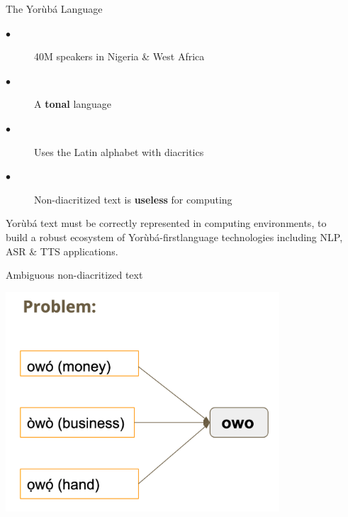 \documentclass[final]{beamer}
\newlength{\sepwid}
\newlength{\onecolwid}
\begin{document}
\begin{frame}[t] %

\begin{columns}[t] %

\begin{column}{\sepwid}\end{column} %

\begin{column}{\onecolwid} %


\begin{block}{The Yor{\`u}b{\'a} Language}

\begin{description}
  \item[$\bullet$] 40M speakers in Nigeria \& West Africa
  \item[$\bullet$] A \textbf{tonal} language
  \item[$\bullet$] Uses the Latin alphabet with diacritics
  \item[$\bullet$] Non-diacritized text is \textbf{useless} for computing
\end{description}

\vspace{10mm}

Yor{\`u}b{\'a} text must be correctly represented in computing environments, to build a robust ecosystem of Yor{\`u}b{\'a}-firstlanguage technologies including NLP, ASR \& TTS applications.

\end{block}

\vspace{10mm}

\begin{block}{Ambiguous non-diacritized text}

\begin{center}
  \includegraphics[trim = 0mm 0mm 0mm 0mm, clip, width=0.80\textwidth]{figures/problem.pdf}
\end{center}


\end{block}
\end{column}
\end{columns}
\end{frame}
\end{document}

